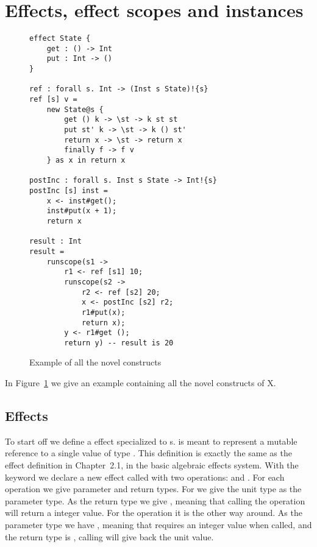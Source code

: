 \section{Effects, effect scopes and instances}
\label{section:basics}

\begin{figure}
\caption{Example of all the novel constructs}
\begin{verbatim}
effect State {
	get : () -> Int
	put : Int -> ()
}

ref : forall s. Int -> (Inst s State)!{s}
ref [s] v =
	new State@s {
		get () k -> \st -> k st st
		put st' k -> \st -> k () st'
		return x -> \st -> return x
		finally f -> f v
	} as x in return x

postInc : forall s. Inst s State -> Int!{s}
postInc [s] inst =
	x <- inst#get();
	inst#put(x + 1);
	return x

result : Int
result =
	runscope(s1 ->
		r1 <- ref [s1] 10;
		runscope(s2 ->
			r2 <- ref [s2] 20;
			x <- postInc [s2] r2;
			r1#put(x);
			return x);
		y <- r1#get ();
		return y) -- result is 20
\end{verbatim}
\label{fig:example1}
\end{figure}

In Figure~\ref{fig:example1} we give an example containing all the novel constructs of X.

\subsection{Effects}

To start off we define a  effect specialized to s.
 is meant to represent a mutable reference to a single value of type .
This definition is exactly the same as the  effect definition in Chapter~2.1, in the basic algebraic effects system.
With the  keyword we declare a new effect called  with two operations:  and .
For each operation we give parameter and return types. For  we give the unit type \ident{()} as the parameter type.
As the return type we give , meaning that calling the  operation will return a integer value.
For the  operation it is the other way around.
As the parameter type we have , meaning that  requires an integer value when called, and the return type is \ident{()}, calling  will give back the unit value.


